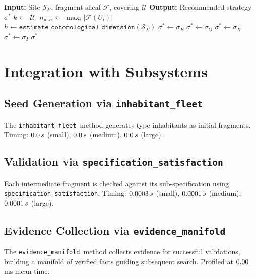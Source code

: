 \documentclass[11pt]{article}
\newcommand{\FragmentSpace}{\mathcal{F}}
\newcommand{\SpecSpace}{\mathcal{S}_\Sigma}
\newcommand{\SpecSat}{\texttt{specification\_satisfaction}}
\newcommand{\InhabFleet}{\texttt{inhabitant\_fleet}}
\newcommand{\EvidManifold}{\texttt{evidence\_manifold}}
\begin{document}
\begin{algorithm}[H]
\caption{Adaptive Strategy Selection}
\label{alg:strategy-select}
\begin{algorithmic}[1]
\STATE \textbf{Input:} Site $\SpecSpace$, fragment sheaf
       $\FragmentSpace$, covering $\mathcal{U}$
\STATE \textbf{Output:} Recommended strategy $\sigma^*$
\STATE $k \gets |\mathcal{U}|$
\STATE $n_{\max} \gets \max_i |\FragmentSpace(U_i)|$
\STATE $h \gets \texttt{estimate\_cohomological\_dimension}(\SpecSpace)$
  \STATE $\sigma^* \gets \sigma_E$ 
  \STATE $\sigma^* \gets \sigma_O$ 
  \STATE $\sigma^* \gets \sigma_X$ 
\ELSE
  \STATE $\sigma^* \gets \sigma_I$ 
\ENDIF
\RETURN $\sigma^*$
\end{algorithmic}
\end{algorithm}

\section{Integration with Subsystems}\label{sec:integration}

\subsection{Seed Generation via \InhabFleet}
The \InhabFleet\ method generates type inhabitants as initial
fragments.  Timing: $0.0\,s$ (small),
$0.0\,s$ (medium),
$0.0\,s$ (large).

\subsection{Validation via \SpecSat}
Each intermediate fragment is checked against its sub-specification
using \SpecSat.  Timing: $0.0003\,s$
(small), $0.0001\,s$ (medium),
$0.0001\,s$ (large).

\subsection{Evidence Collection via \EvidManifold}
The \EvidManifold\ method collects evidence for successful validations,
building a manifold of verified facts guiding subsequent search.
Profiled at $0.00$\,ms mean time.
\end{document}
